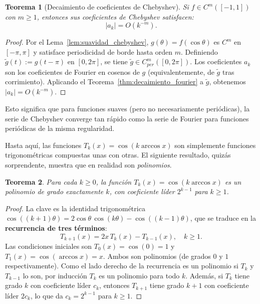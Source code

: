\documentclass[a4paper,11pt]{report}
\newtheorem{theorem}{Teorema}[chapter]
\begin{document}
\begin{theorem}[Decaimiento de coeficientes de Chebyshev]\label{thm:decaimiento_chebyshev}
Si $f \in C^m([-1,1])$ con $m \geq 1$, entonces sus coeficientes de Chebyshev satisfacen:
\[
|a_k| = O(k^{-m}).
\]
\end{theorem}

\begin{proof}
Por el Lema~\ref{lem:suavidad_chebyshev}, $g(\theta)=f(\cos\theta)$ es $C^m$ en $[-\pi,\pi]$ y satisface periodicidad de borde hasta orden $m$. Definiendo $\widetilde g(t):=g(t-\pi)$ en $[0,2\pi]$, se tiene $\widetilde g\in C^m_{per}([0,2\pi])$. Los coeficientes $a_k$ son los coeficientes de Fourier en cosenos de $g$ (equivalentemente, de $\widetilde g$ tras corrimiento). Aplicando el Teorema~\ref{thm:decaimiento_fourier} a $\widetilde g$, obtenemos $|a_k|=O(k^{-m})$.
\end{proof}

Esto significa que para funciones suaves (pero no necesariamente periódicas), la serie de Chebyshev converge tan rápido como la serie de Fourier para funciones periódicas de la misma regularidad. 

Hasta aquí, las funciones $T_k(x) = \cos(k\arccos x)$ son simplemente funciones trigonométricas compuestas unas con otras. El siguiente resultado, quizás sorprendente, muestra que en realidad son \emph{polinomios}.

\begin{theorem}\label{thm:chebyshev_polinomios}
Para cada $k \geq 0$, la función $T_k(x) = \cos(k\arccos x)$ es un polinomio de grado exactamente $k$, con coeficiente líder $2^{k-1}$ para $k \geq 1$.
\end{theorem}

\begin{proof}
La clave es la identidad trigonométrica $\cos((k+1)\theta) = 2\cos\theta\,\cos(k\theta) - \cos((k-1)\theta)$, que se traduce en la \textbf{recurrencia de tres términos}:
\[
T_{k+1}(x) = 2x\,T_k(x) - T_{k-1}(x), \quad k \geq 1.
\]
Las condiciones iniciales son $T_0(x) = \cos(0) = 1$ y $T_1(x) = \cos(\arccos x) = x$.  Ambos son polinomios (de grados $0$ y $1$ respectivamente).  Como el lado derecho de la recurrencia es un polinomio si $T_k$ y $T_{k-1}$ lo son, por inducción $T_k$ es un polinomio para todo $k$.  Además, si $T_k$ tiene grado $k$ con coeficiente líder $c_k$, entonces $T_{k+1}$ tiene grado $k+1$ con coeficiente líder $2c_k$, lo que da $c_k = 2^{k-1}$ para $k \geq 1$.
\end{proof}
\end{document}
